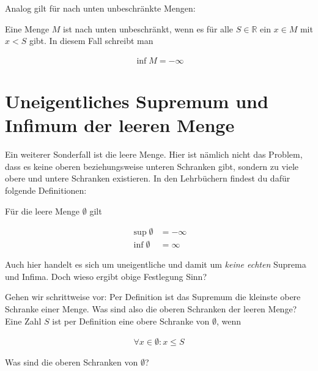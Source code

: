 \documentclass[fontsize=9pt,
               parskip=half-,
               DIV=14,
               listof=chapterentry,
               tocflat]{scrbook}
\begin{document}
Analog gilt für nach unten unbeschränkte Mengen:

\begin{definition*}
Eine Menge $M$ ist nach unten unbeschränkt, wenn es für alle $S\in \mathbb {R} $ ein $x\in M$ mit $x<S$ gibt. In diesem Fall schreibt man

\begin{align*}
\inf M=-\infty 
\end{align*}

\end{definition*}

\section{Uneigentliches Supremum und Infimum der leeren Menge}

Ein weiterer Sonderfall ist die leere Menge. Hier ist nämlich nicht das Problem, dass es keine oberen beziehungsweise unteren Schranken gibt, sondern zu viele obere und untere Schranken existieren. In den Lehrbüchern findest du dafür folgende Definitionen:

\begin{definition*}
Für die leere Menge $\emptyset $ gilt

\begin{align*}
\sup \emptyset &=-\infty \\\inf \emptyset &=\infty 
\end{align*}

\end{definition*}

Auch hier handelt es sich um uneigentliche und damit um \emph{keine echten} Suprema und Infima. Doch wieso ergibt obige Festlegung Sinn?

Gehen wir schrittweise vor: Per Definition ist das Supremum die kleinste obere Schranke einer Menge. Was sind also die oberen Schranken der leeren Menge? Eine Zahl $S$ ist per Definition eine obere Schranke von $\emptyset $, wenn

\begin{align*}
\forall x\in \emptyset :x\leq S
\end{align*}

\begin{mdframed}[style=semanticbox,frametitleaboveskip=3pt,innerbottommargin=3pt,frametitle=Frage]
Was sind die oberen Schranken von $\emptyset $?

\end{mdframed}
\end{document}
